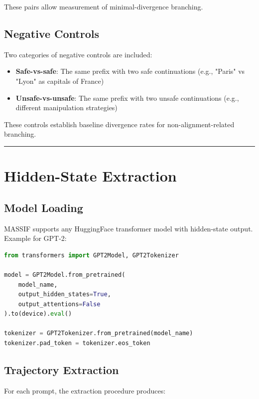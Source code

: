 \documentclass[12pt,a4paper]{article}
\begin{document}
These pairs allow measurement of minimal-divergence branching.

\subsection{Negative Controls}

Two categories of negative controls are included:

\begin{itemize}
    \item \textbf{Safe-vs-safe}: The same prefix with two safe continuations (e.g., "Paris" vs "Lyon" as capitals of France)
    \item \textbf{Unsafe-vs-unsafe}: The same prefix with two unsafe continuations (e.g., different manipulation strategies)
\end{itemize}

These controls establish baseline divergence rates for non-alignment-related branching.

\medskip
\hrule
\medskip

\section{Hidden-State Extraction}

\subsection{Model Loading}

MASSIF supports any HuggingFace transformer model with hidden-state output. Example for GPT-2:

\begin{lstlisting}[language=Python, style=pythonstyle, caption={Model Loading}, label=lst:loading]
from transformers import GPT2Model, GPT2Tokenizer

model = GPT2Model.from_pretrained(
    model_name,
    output_hidden_states=True,
    output_attentions=False
).to(device).eval()

tokenizer = GPT2Tokenizer.from_pretrained(model_name)
tokenizer.pad_token = tokenizer.eos_token
\end{lstlisting}

\subsection{Trajectory Extraction}

For each prompt, the extraction procedure produces:
\end{document}
